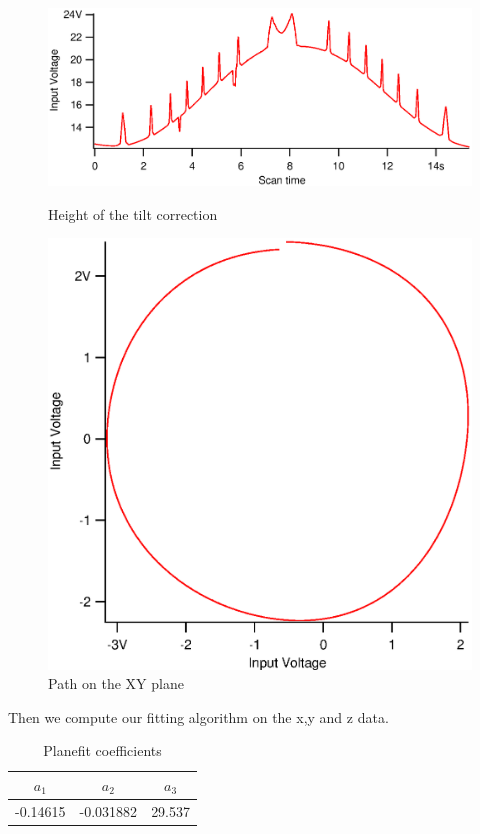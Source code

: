 \begin{figure}[!ht]
\begin{minipage}[b]{0.45\linewidth}
\centering
\includegraphics[width=\textwidth]{images/spiraheight30uv2.eps}
\caption{Height of the tilt correction}
\label{spiraheight30uv2}
\end{minipage}
\hspace{0.5cm}
\begin{minipage}[b]{0.45\linewidth}
\centering
\includegraphics[width=\textwidth]{images/xsenvsysen30u.eps}
\caption{Path on the XY plane}
\label{xsenvsysen30u}
\end{minipage}
\end{figure}

Then we compute our fitting algorithm on the x,y and z data.
\begin{table}[H]
\caption{Planefit coefficients} %
\centering %
\begin{tabular}{c c c} %
\hline\hline %
$a_1$ & $a_2$ & $a_3$ \\ [0.5ex] %
\hline %
-0.14615  & -0.031882 & 29.537 \\[1ex]

\hline %
\end{tabular}
\label{table:planefit} %
\end{table}


